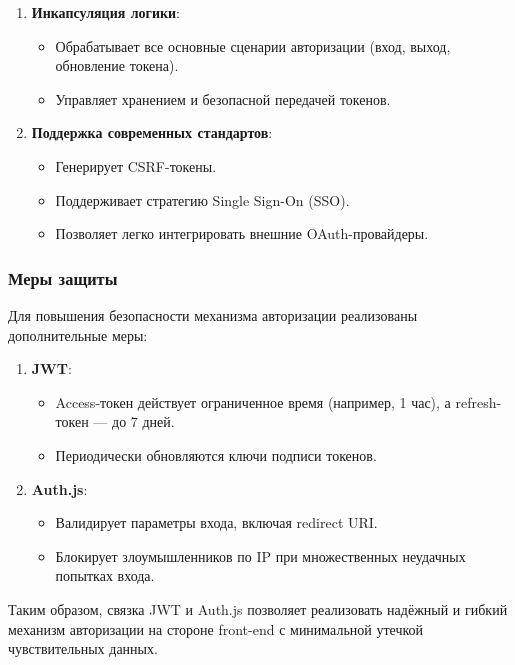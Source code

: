 \begin{enumerate}
    \item \textbf{Инкапсуляция логики}:
    \begin{itemize}
        \item Обрабатывает все основные сценарии авторизации (вход, выход, обновление токена).
        \item Управляет хранением и безопасной передачей токенов.
    \end{itemize}

    \item \textbf{Поддержка современных стандартов}:
    \begin{itemize}
        \item Генерирует CSRF-токены.
        \item Поддерживает стратегию Single Sign-On (SSO).
        \item Позволяет легко интегрировать внешние OAuth-провайдеры.
    \end{itemize}
\end{enumerate}

\subsubsection{Меры защиты}
Для повышения безопасности механизма авторизации реализованы дополнительные меры:

\begin{enumerate}
    \item \textbf{JWT}:
    \begin{itemize}
        \item Access-токен действует ограниченное время (например, 1 час), а refresh-токен — до 7 дней.
        \item Периодически обновляются ключи подписи токенов.
    \end{itemize}

    \item \textbf{Auth.js}:
    \begin{itemize}
        \item Валидирует параметры входа, включая redirect URI.
        \item Блокирует злоумышленников по IP при множественных неудачных попытках входа.
    \end{itemize}
\end{enumerate}

Таким образом, связка JWT и Auth.js позволяет реализовать надёжный и гибкий механизм авторизации на стороне front-end с минимальной утечкой чувствительных данных.
